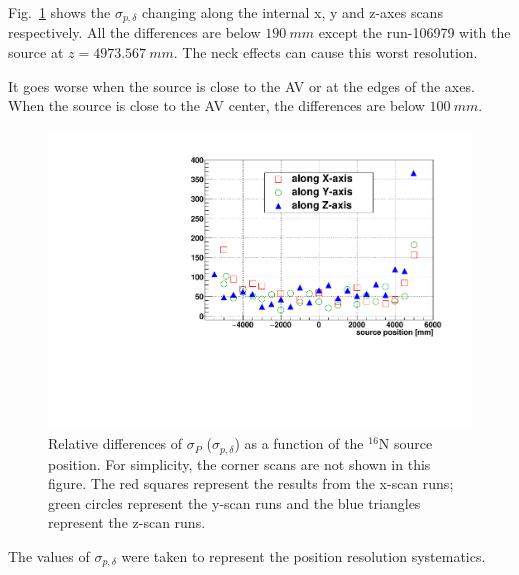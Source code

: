 Fig.~\ref{pos_relative_sigma_biasesVsPositions} shows the $\sigma_{p,\delta}$ changing along the internal x, y and z-axes scans respectively. All the differences are below $190~mm$ except the run-106979 with the source at $z=4973.567~mm$. The neck effects can cause this worst resolution. 

It goes worse when the source is close to the AV or at the edges of the axes. When the source is close to the AV center, the differences are below $100~mm$.

\begin{figure}[!htb]
	\centering
	\includegraphics[width=16cm]{N16_6176_pos_sigmaP_data_mc.pdf}
	\caption[Relative differences of $\sigma_P$ ($\sigma_{p,\delta}$) as a function of the $^{16}$N source position.]{Relative differences of $\sigma_P$ ($\sigma_{p,\delta}$) as a function of the $^{16}$N source position. For simplicity, the corner scans are not shown in this figure. The red squares represent the results from the x-scan runs; green circles represent the y-scan runs and the blue triangles represent the z-scan runs.}
	\label{pos_relative_sigma_biasesVsPositions}
\end{figure}

The values of $\sigma_{p,\delta}$ were taken to represent the position resolution systematics.

